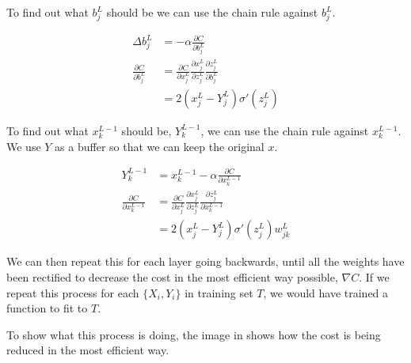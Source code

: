 To find out what $b^L_j$ should be we can use the chain rule against $b^L_j$.

\begin{equation}
\begin{split}
\Delta b^L_j&=-\alpha\frac{\partial C}{\partial b^L_j}\\
\frac{\partial C}{\partial b^L_j}&=\frac{\partial C}{\partial x^L_j}\frac{\partial x^L_j}{\partial z^L_j}\frac{\partial z^L_j}{\partial b^L_j}\\
&=2(x_{j}^{L}-Y^L_j)\sigma'(z^L_j)
\end{split}
\label{eq:gcrb}
\end{equation}

To find out what $x^{L-1}_k$ should be, $Y^{L-1}_k$, we can use the chain rule against $x^{L-1}_k$. We use $Y$ as a buffer so that we can keep the original $x$.

\begin{equation}
\begin{split}
Y^{L-1}_k&=x^{L-1}_k-\alpha\frac{\partial C}{\partial x^{L-1}_k}\\
\frac{\partial C}{\partial x^{L-1}_k}&=\frac{\partial C}{\partial x^L_j}\frac{\partial x^L_j}{\partial z^L_j}\frac{\partial z^L_j}{\partial x^{L-1}_k}\\
&=2(x_{j}^{L}-Y^L_j)\sigma'(z^L_j)w_{jk}^L
\end{split}
\label{eq:gcrY}
\end{equation}

We can then repeat this for each \gls{layer} going backwards, until all the weights have been rectified to decrease the \gls{cost} in the most efficient way possible, $\nabla C$. If we repeat this process for each $\{X_i,Y_i\}$ in training set $T$, we would have trained a function to fit to $T$. \cite[p.~365]{nnd}

To show what this process is doing, the image in  shows how the cost is being reduced in the most efficient way.

